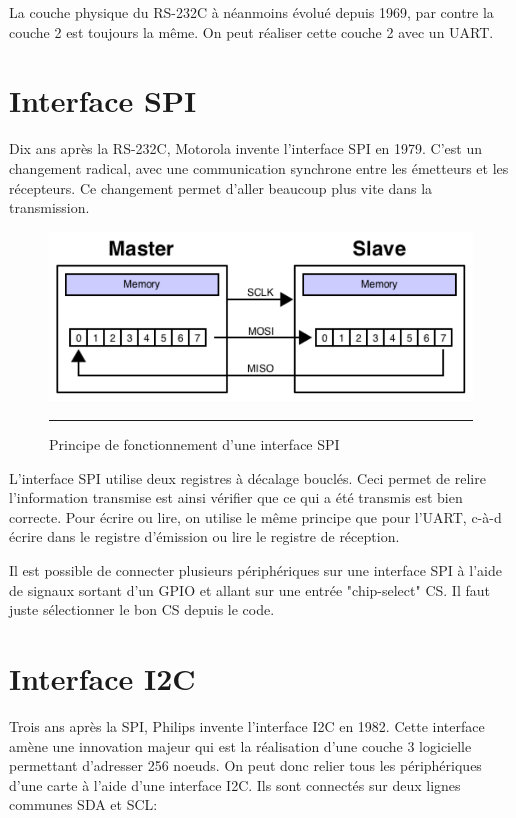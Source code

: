 La couche physique du RS-232C à néanmoins évolué depuis 1969, par contre la couche 2 est toujours la même. On peut réaliser cette couche 2 avec un UART.

\section{Interface SPI}

Dix ans après la RS-232C, Motorola invente l'interface SPI en 1979. C'est un changement radical, avec une communication synchrone entre les émetteurs et les récepteurs. Ce changement permet d'aller beaucoup plus vite dans la transmission.

\begin{figure}[htb]
  \centering
  \includegraphics[width=12cm]{./Figures/serial/SPI_8-bit_circular_transfer.pdf}
  \rule{35em}{0.5pt}
  \caption[spi]{Principe de fonctionnement d'une interface SPI}
  \label{fig:spi}
\end{figure}

L'interface SPI utilise deux registres à décalage bouclés. Ceci permet de relire l'information transmise est ainsi vérifier que ce qui a été transmis est bien correcte. Pour écrire ou lire, on utilise le même principe que pour l'UART, c-à-d écrire dans le registre d'émission ou lire le registre de réception.

Il est possible de connecter plusieurs périphériques sur une interface SPI à l'aide de signaux sortant d'un GPIO et allant sur une entrée "chip-select" CS. Il faut juste sélectionner le bon CS depuis le code.

\section{Interface I2C}

Trois ans après la SPI, Philips invente l'interface I2C en 1982. Cette interface amène une innovation majeur qui est la réalisation d'une couche 3 logicielle permettant d'adresser 256 noeuds. On peut donc relier tous les périphériques d'une carte à l'aide d'une interface I2C. Ils sont connectés sur deux lignes communes SDA et SCL:

